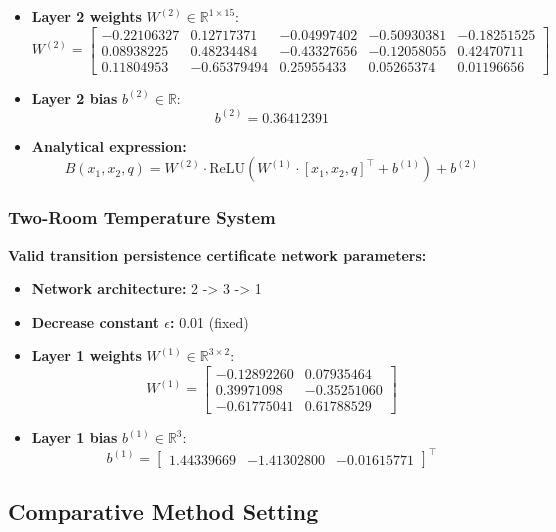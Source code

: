 \begin{itemize}
    \item \textbf{Layer 2 weights} $W^{(2)} \in \mathbb{R}^{1 \times 15}$:
    {\footnotesize
    \[
    W^{(2)} = \begin{bmatrix}
    -0.22106327 &  0.12717371 & -0.04997402 & -0.50930381 & -0.18251525 \\
     0.08938225 &  0.48234484 & -0.43327656 & -0.12058055 &  0.42470711 \\
     0.11804953 & -0.65379494 &  0.25955433 &  0.05265374 &  0.01196656
    \end{bmatrix}
    \]}
    
    \item \textbf{Layer 2 bias} $b^{(2)} \in \mathbb{R}$:
    \[
    b^{(2)} = 0.36412391
    \]
    
    \item \textbf{Analytical expression:}
    \[
    B(x_1, x_2, q) = W^{(2)} \cdot \text{ReLU}(W^{(1)} \cdot [x_1, x_2, q]^\top + b^{(1)}) + b^{(2)}
    \]
\end{itemize}

\subsubsection{Two-Room Temperature System}
\label{app:two_room_neural}
\textbf{Valid transition persistence certificate network parameters:}

\begin{itemize}
    \item \textbf{Network architecture:} 2 -> 3 -> 1
    \item \textbf{Decrease constant $\epsilon$:} 0.01 (fixed)
    \item \textbf{Layer 1 weights} $W^{(1)} \in \mathbb{R}^{3 \times 2}$:
    \[
    W^{(1)} = \begin{bmatrix}
    -0.12892260 &  0.07935464 \\
     0.39971098 & -0.35251060 \\
    -0.61775041 &  0.61788529
    \end{bmatrix}
    \]
    
    \item \textbf{Layer 1 bias} $b^{(1)} \in \mathbb{R}^{3}$:
    \[
    b^{(1)} = \begin{bmatrix}
     1.44339669 & -1.41302800 & -0.01615771
    \end{bmatrix}^\top
    \]
\end{itemize}

\subsection{Comparative Method Setting}

